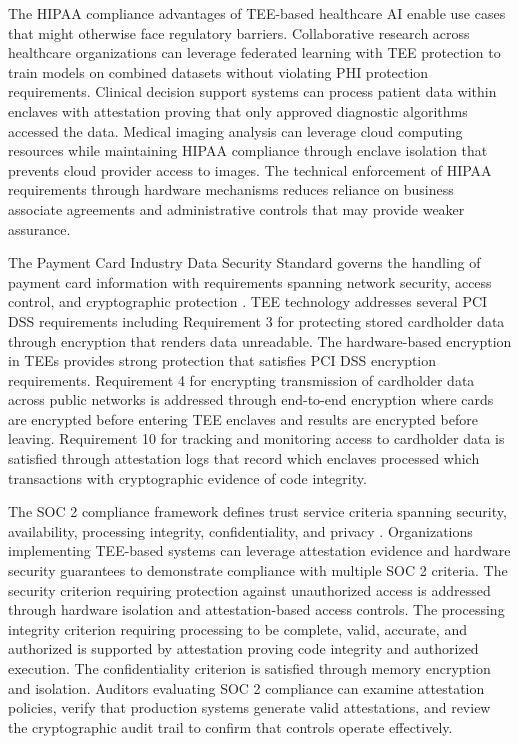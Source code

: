 The HIPAA compliance advantages of TEE-based healthcare AI enable use cases that might otherwise face regulatory barriers. Collaborative research across healthcare organizations can leverage federated learning with TEE protection to train models on combined datasets without violating PHI protection requirements. Clinical decision support systems can process patient data within enclaves with attestation proving that only approved diagnostic algorithms accessed the data. Medical imaging analysis can leverage cloud computing resources while maintaining HIPAA compliance through enclave isolation that prevents cloud provider access to images. The technical enforcement of HIPAA requirements through hardware mechanisms reduces reliance on business associate agreements and administrative controls that may provide weaker assurance.

The Payment Card Industry Data Security Standard governs the handling of payment card information with requirements spanning network security, access control, and cryptographic protection \cite{pci_dss}. TEE technology addresses several PCI DSS requirements including Requirement 3 for protecting stored cardholder data through encryption that renders data unreadable. The hardware-based encryption in TEEs provides strong protection that satisfies PCI DSS encryption requirements. Requirement 4 for encrypting transmission of cardholder data across public networks is addressed through end-to-end encryption where cards are encrypted before entering TEE enclaves and results are encrypted before leaving. Requirement 10 for tracking and monitoring access to cardholder data is satisfied through attestation logs that record which enclaves processed which transactions with cryptographic evidence of code integrity.

The SOC 2 compliance framework defines trust service criteria spanning security, availability, processing integrity, confidentiality, and privacy \cite{soc2_compliance}. Organizations implementing TEE-based systems can leverage attestation evidence and hardware security guarantees to demonstrate compliance with multiple SOC 2 criteria. The security criterion requiring protection against unauthorized access is addressed through hardware isolation and attestation-based access controls. The processing integrity criterion requiring processing to be complete, valid, accurate, and authorized is supported by attestation proving code integrity and authorized execution. The confidentiality criterion is satisfied through memory encryption and isolation. Auditors evaluating SOC 2 compliance can examine attestation policies, verify that production systems generate valid attestations, and review the cryptographic audit trail to confirm that controls operate effectively.

